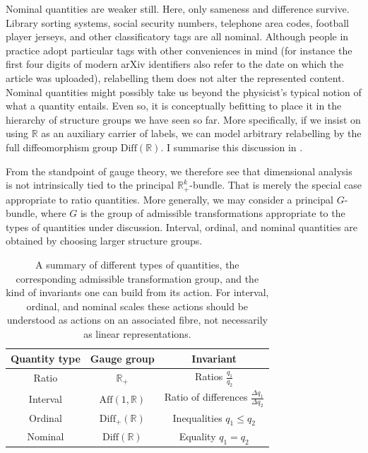 \documentclass[12pt]{article}
\numberwithin{equation}{section}
\newcommand{\R}{\mathbb{R}}
\begin{document}
Nominal quantities are weaker still. Here, only sameness and difference survive. Library sorting systems, social security numbers, telephone area codes, football player jerseys, and other classificatory tags are all nominal. Although people in practice adopt particular tags with other conveniences in mind (for instance the first four digits of modern arXiv identifiers also refer to the date on which the article was uploaded), relabelling them does not alter the represented content. Nominal quantities might possibly take us beyond the physicist's typical notion of what a quantity entails. Even so, it is conceptually befitting to place it in the hierarchy of structure groups we have seen so far. More specifically, if we insist on using $\R$ as an auxiliary carrier of labels, we can model arbitrary relabelling by the full diffeomorphism group $\mathrm{Diff}(\R)$. I summarise this discussion in .

From the standpoint of gauge theory, we therefore see that dimensional analysis is not intrinsically tied to the principal $\R_+^k$-bundle. That is merely the special case appropriate to ratio quantities. More generally, we may consider a principal $G$-bundle, where $G$ is the group of admissible transformations appropriate to the types of quantities under discussion. Interval, ordinal, and nominal quantities are obtained by choosing larger structure groups.

\begin{table}[H]
    \renewcommand{\arraystretch}{1.5}
    \centering
    \begin{tabular}{|c|c|c|}
        \hline \textbf{\textsf{Quantity type}} & \textbf{\textsf{Gauge group}} & \textbf{\textsf{Invariant}} \\ \hline
        Ratio & $\R_+$ & Ratios $\tfrac{q_1}{q_2}$\\ \hline
        Interval & $\mathrm{Aff}(1,\R)$ & Ratio of differences $\tfrac{\Delta q_1}{\Delta q_2}$\\ \hline
        Ordinal & $\mathrm{Diff}_+(\R)$ & Inequalities $q_1\leq q_2$\\ \hline
        Nominal & $\mathrm{Diff}(\R)$ & Equality $q_1= q_2$\\ \hline
    \end{tabular}
    \caption{A summary of different types of quantities, the corresponding admissible transformation group, and the kind of invariants one can build from its action. For interval, ordinal, and nominal scales these actions should be understood as actions on an associated fibre, not necessarily as linear representations.}
    \label{table}
\end{table}
\end{document}
